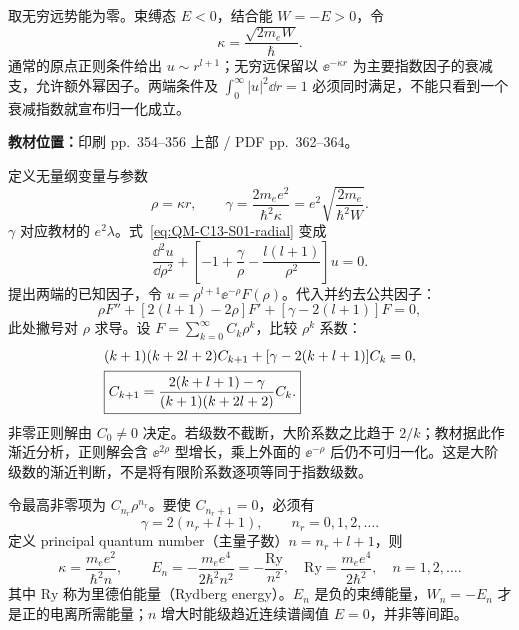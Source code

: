 取无穷远势能为零。束缚态 $E<0$，结合能 $W=-E>0$，令
\begin{equation}
  \kappa=\frac{\sqrt{2m_eW}}\hbar.
\end{equation}
通常的原点正则条件给出 $u\sim r^{l+1}$；无穷远保留以 $\ee^{-\kappa r}$ 为主要指数因子的衰减支，允许额外幂因子。两端条件及 $\int_0^\infty|u|^2\dd r=1$ 必须同时满足，不能只看到一个衰减指数就宣布归一化成立。

\textbf{教材位置：}印刷 pp.~354--356 上部 / PDF pp.~362--364。

定义无量纲变量与参数
\begin{equation}
  \rho=\kappa r,\qquad
  \gamma=\frac{2m_e e^2}{\hbar^2\kappa}
    =e^2\sqrt{\frac{2m_e}{\hbar^2W}}.
\end{equation}
$\gamma$ 对应教材的 $e^2\lambda$。式~\eqref{eq:QM-C13-S01-radial} 变成
\begin{equation}
  \frac{\dd^2u}{\dd\rho^2}
   +\left[-1+\frac\gamma\rho-\frac{l(l+1)}{\rho^2}\right]u=0.
\end{equation}
提出两端的已知因子，令 $u=\rho^{l+1}\ee^{-\rho}F(\rho)$。代入并约去公共因子：
\begin{equation}
  \rho F''+[2(l+1)-2\rho]F'+[\gamma-2(l+1)]F=0,
\end{equation}
此处撇号对 $\rho$ 求导。设 $F=\sum_{k=0}^\infty C_k\rho^k$，比较 $\rho^k$ 系数：
\begin{align}
  &(k+1)(k+2l+2)C_{k+1}
     +[\gamma-2(k+l+1)]C_k=0,\notag\\
  &\boxed{C_{k+1}=\frac{2(k+l+1)-\gamma}{(k+1)(k+2l+2)}C_k.}
  \label{eq:QM-C13-S01-recurrence}
\end{align}
非零正则解由 $C_0\ne0$ 决定。若级数不截断，大阶系数之比趋于 $2/k$；教材据此作渐近分析，正则解会含 $\ee^{2\rho}$ 型增长，乘上外面的 $\ee^{-\rho}$ 后仍不可归一化。这是大阶级数的渐近判断，不是将有限阶系数逐项等同于指数级数。

令最高非零项为 $C_{n_r}\rho^{n_r}$。要使 $C_{n_r+1}=0$，必须有
\begin{equation}
  \gamma=2(n_r+l+1),\qquad n_r=0,1,2,\ldots.
\end{equation}
定义 principal quantum number（主量子数）$n=n_r+l+1$，则
\begin{equation}
  \kappa=\frac{m_e e^2}{\hbar^2n},\qquad
  \boxed{E_n=-\frac{m_e e^4}{2\hbar^2n^2}
    =-\frac{\mathrm{Ry}}{n^2},\quad
    \mathrm{Ry}=\frac{m_e e^4}{2\hbar^2},\quad n=1,2,\ldots.}
\end{equation}
其中 $\mathrm{Ry}$ 称为里德伯能量（Rydberg energy）。$E_n$ 是负的束缚能量，$W_n=-E_n$ 才是正的电离所需能量；$n$ 增大时能级趋近连续谱阈值 $E=0$，并非等间距。

